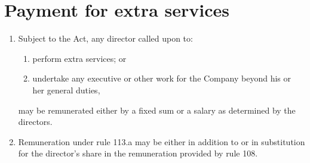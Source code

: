 \section{Payment for extra services}

\begin{enumerate}[label=(\alph*)]
    \item Subject to the Act, any director called upon to:
    \begin{enumerate}[label=(\roman*)]
        \item perform extra services; or
        \item undertake any executive or other work for the Company beyond his or her general duties,
    \end{enumerate}
    
    may be remunerated either by a fixed sum or a salary as determined by the directors.
    
    \item Remuneration under rule 113.a may be either in addition to or in substitution for the director's share in the remuneration provided by rule 108.
\end{enumerate} 
